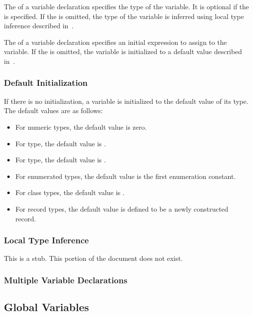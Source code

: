 The  of a variable declaration specifies the type of
the variable.  It is optional if the  is
specified.  If the  is omitted, the type of the
variable is inferred using local type inference described
in~.

The  of a variable declaration specifies an
initial expression to assign to the variable.  If
the  is omitted, the variable is initialized
to a default value described in~.

\subsubsection{Default Initialization}
\label{Default_Initialization}

If there is no initialization, a variable is initialized to the
default value of its type.  The default values are as follows:
\begin{itemize}
\item For numeric types, the default value is zero.
\item For  type, the default value is .
\item For  type, the default value is .
\item For enumerated types, the default value is the first enumeration constant.
\item For class types, the default value is .
\item For record types, the default value is defined to be a newly constructed record.
\end{itemize}

\subsubsection{Local Type Inference}
\label{Local_Type_Inference}

This is a stub.  This portion of the document does not exist.

\subsubsection{Multiple Variable Declarations}
\label{Multiple_Variables}

\subsection{Global Variables}
\label{Global_Variables}

